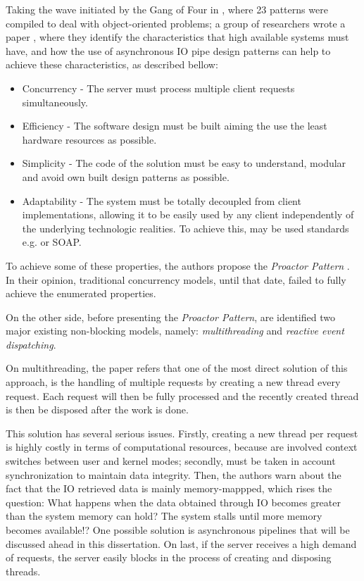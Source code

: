 Taking the wave initiated by the Gang of Four in \citep{gof}, where 23 patterns were compiled to deal with object-oriented problems; a group of researchers wrote a paper \citep{proactor}, where they identify the characteristics that high available systems must have, and how the use of asynchronous IO pipe design patterns can help to achieve these characteristics, as described bellow:
\begin{itemize}
	\item Concurrency - The server must process multiple client requests simultaneously.\\
	\item Efficiency - The software design must be built aiming the use the least hardware resources as possible. \\
	\item Simplicity - The code of the solution must be easy to understand, modular and avoid own built design patterns as possible. \\
    \item Adaptability - The system must be totally decoupled from client implementations, allowing it to be easily used by any client independently of the underlying technologic realities. To achieve this, may be used standards e.g. \cite{REST} or SOAP.\\
\end{itemize}

To achieve some of these properties, the authors propose the \textit{Proactor Pattern} \citep{proactor}. In their opinion, traditional concurrency models, until that date, failed to fully achieve the enumerated properties.

On the other side, before presenting the \textit{Proactor Pattern}, are identified two major existing non-blocking models, namely: \textit{multithreading} and \textit{reactive event dispatching}. 

On multithreading, the paper refers that one of the most direct solution of this approach, is the handling of multiple requests by creating a new thread every request. Each request will then be fully processed and the recently created thread is then be disposed after the work is done. 

This solution has several serious issues. Firstly, creating a new thread per request is highly costly in terms of computational resources,
because are involved context switches between user and kernel modes; secondly, must be taken in account synchronization to maintain data integrity.
Then, the authors warn about the fact that the IO retrieved data is mainly memory-mappped, which rises the question: What happens when the data obtained through IO becomes greater than the system memory can hold? The system stalls until more memory becomes available!? One possible solution is asynchronous pipelines that will be discussed ahead in this dissertation.
On last, if the server receives a high demand of requests, the server easily blocks in the process of creating and disposing threads. 

